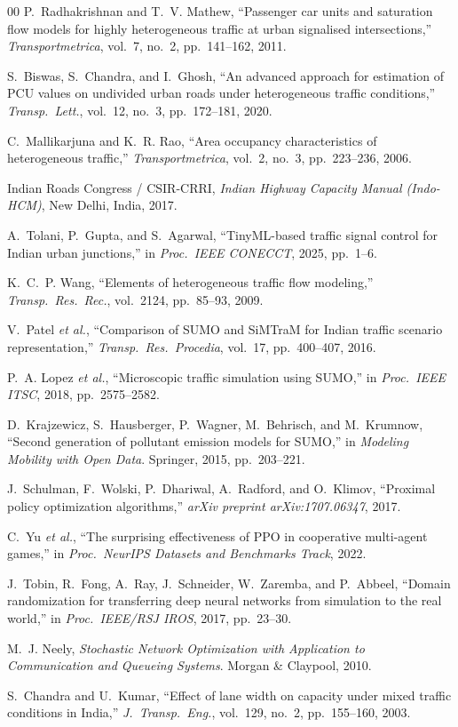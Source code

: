 \documentclass[journal]{IEEEtran}
\begin{document}
\begin{thebibliography}{00}
P.~Radhakrishnan and T.~V. Mathew, ``Passenger car units and saturation
flow models for highly heterogeneous traffic at urban signalised
intersections,'' \textit{Transportmetrica}, vol.~7, no.~2,
pp.~141--162, 2011.

S.~Biswas, S.~Chandra, and I.~Ghosh, ``An advanced approach for
estimation of PCU values on undivided urban roads under heterogeneous
traffic conditions,'' \textit{Transp.\ Lett.}, vol.~12, no.~3,
pp.~172--181, 2020.

C.~Mallikarjuna and K.~R. Rao, ``Area occupancy characteristics of
heterogeneous traffic,'' \textit{Transportmetrica}, vol.~2, no.~3,
pp.~223--236, 2006.

Indian Roads Congress / CSIR-CRRI, \textit{Indian Highway Capacity
Manual (Indo-HCM)}, New Delhi, India, 2017.

A.~Tolani, P.~Gupta, and S.~Agarwal, ``TinyML-based traffic signal
control for Indian urban junctions,'' in \textit{Proc.\ IEEE CONECCT},
2025, pp.~1--6.

K.~C.~P. Wang, ``Elements of heterogeneous traffic flow modeling,''
\textit{Transp.\ Res.\ Rec.}, vol.~2124, pp.~85--93, 2009.

V.~Patel \textit{et al.}, ``Comparison of SUMO and SiMTraM for Indian
traffic scenario representation,'' \textit{Transp.\ Res.\ Procedia},
vol.~17, pp.~400--407, 2016.

P.~A. Lopez \textit{et al.}, ``Microscopic traffic simulation using
SUMO,'' in \textit{Proc.\ IEEE ITSC}, 2018, pp.~2575--2582.

D.~Krajzewicz, S.~Hausberger, P.~Wagner, M.~Behrisch, and M.~Krumnow,
``Second generation of pollutant emission models for SUMO,'' in
\textit{Modeling Mobility with Open Data}. Springer, 2015, pp.~203--221.

J.~Schulman, F.~Wolski, P.~Dhariwal, A.~Radford, and O.~Klimov,
``Proximal policy optimization algorithms,'' \textit{arXiv preprint
arXiv:1707.06347}, 2017.

C.~Yu \textit{et al.}, ``The surprising effectiveness of PPO in
cooperative multi-agent games,'' in \textit{Proc.\ NeurIPS Datasets and
Benchmarks Track}, 2022.

J.~Tobin, R.~Fong, A.~Ray, J.~Schneider, W.~Zaremba, and P.~Abbeel,
``Domain randomization for transferring deep neural networks from
simulation to the real world,'' in \textit{Proc.\ IEEE/RSJ IROS}, 2017,
pp.~23--30.


M.~J. Neely, \textit{Stochastic Network Optimization with Application to
Communication and Queueing Systems}. Morgan \& Claypool, 2010.

S.~Chandra and U.~Kumar, ``Effect of lane width on capacity under mixed
traffic conditions in India,'' \textit{J.\ Transp.\ Eng.}, vol.~129,
no.~2, pp.~155--160, 2003.

\end{thebibliography}
\end{document}
